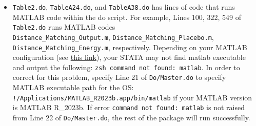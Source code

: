 \documentclass[12pt,notitlepage]{article}
\begin{document}
\begin{itemize}
\item \texttt{Table2.do}, \texttt{TableA24.do}, and \texttt{TableA38.do} has lines of code that runs MATLAB code within the do script. For example, Lines 100, 322, 549 of \texttt{Table2.do} runs MATLAB codes \\ \texttt{Distance\_Matching\_Output.m}, \texttt{Distance\_Matching\_Placebo.m},  \texttt{Distance\_Matching\_Energy.m}, respectively. Depending on your MATLAB configuration (see \href{https://www.mathworks.com/matlabcentral/answers/93830-why-do-i-receive-the-error-matlab-command-not-found-when-starting-matlab-on-linux}{this link}), your STATA may not find matlab executable and output the following: \texttt{zsh command not found: matlab}.  In order to correct for this problem, specify Line 21 of \texttt{Do/Master.do} to specify MATLAB executable path for the OS: \texttt{!/Applications/MATLAB\_R2023b.app/bin/matlab} if your MATLAB version is MATLAB R\_2023b. If error \texttt{command not found: matlab} is not raised from Line 22 of \texttt{Do/Master.do}, the rest of the package will run successfully.
\end{itemize}
\end{document}
